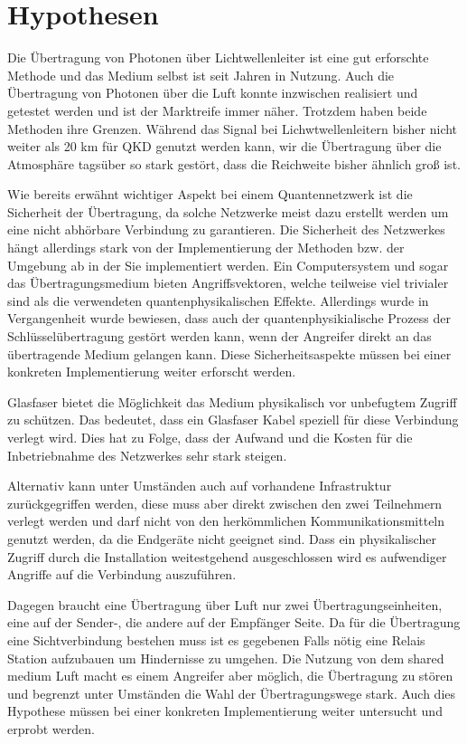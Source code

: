 \chapter{Hypothesen}

Die Übertragung von Photonen über Lichtwellenleiter ist eine gut erforschte Methode und das Medium selbst ist seit Jahren in Nutzung. Auch die Übertragung von Photonen über die Luft konnte inzwischen realisiert und getestet werden und ist der Marktreife immer näher.
Trotzdem haben beide Methoden ihre Grenzen. Während das Signal bei Lichwtwellenleitern bisher nicht weiter als 20 km für \ac{QKD} genutzt werden kann, wir die Übertragung über die Atmosphäre tagsüber so stark gestört, dass die Reichweite bisher ähnlich groß ist.

Wie bereits erwähnt wichtiger Aspekt bei einem Quantennetzwerk ist die Sicherheit der Übertragung, da solche Netzwerke meist dazu erstellt werden um eine nicht abhörbare Verbindung zu garantieren.
Die Sicherheit des Netzwerkes hängt allerdings stark von der Implementierung der Methoden bzw. der Umgebung ab in der Sie implementiert werden. Ein Computersystem und sogar das Übertragungsmedium bieten Angriffsvektoren, welche teilweise viel trivialer sind als die verwendeten quantenphysikalischen Effekte.
Allerdings wurde in Vergangenheit wurde bewiesen, dass auch der quantenphysikialische Prozess der Schlüsselübertragung gestört werden kann, wenn der Angreifer direkt an das übertragende Medium gelangen kann\cite{Fei2018QuantumMA}. Diese Sicherheitsaspekte müssen bei einer konkreten Implementierung weiter erforscht werden.

Glasfaser bietet die Möglichkeit das Medium physikalisch vor unbefugtem Zugriff zu schützen.
Das bedeutet, dass ein Glasfaser Kabel speziell für diese Verbindung verlegt wird.
Dies hat zu Folge, dass der Aufwand und die Kosten für die Inbetriebnahme des Netzwerkes sehr stark steigen.

Alternativ kann unter Umständen auch auf vorhandene Infrastruktur zurückgegriffen werden, diese muss aber direkt zwischen den zwei Teilnehmern verlegt werden und darf nicht von den herkömmlichen Kommunikationsmitteln genutzt werden, da die Endgeräte nicht geeignet sind.
Dass ein physikalischer Zugriff durch die Installation weitestgehend ausgeschlossen wird es aufwendiger Angriffe auf die Verbindung auszuführen.

Dagegen braucht eine Übertragung über Luft nur zwei Übertragungseinheiten, eine auf der Sender-, die andere auf der Empfänger Seite.
Da für die Übertragung eine Sichtverbindung bestehen muss ist es gegebenen Falls nötig eine Relais Station aufzubauen um Hindernisse zu umgehen.
Die Nutzung von dem shared medium Luft macht es einem Angreifer aber möglich, die Übertragung zu stören und begrenzt unter Umständen die Wahl der Übertragungswege stark. Auch dies Hypothese müssen bei einer konkreten Implementierung weiter untersucht und erprobt werden.

